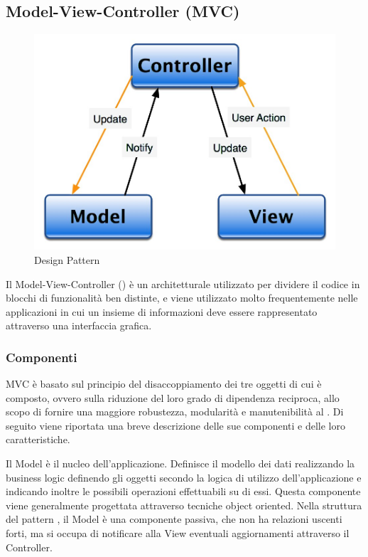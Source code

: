 \documentclass[a4paper, titlepage]{article}
\begin{document}
\subsection{Model-View-Controller (MVC)}
\begin{figure}[htp]
\centering
\includegraphics[scale=0.50]{Img/MVC.jpg}
\caption{Design Pattern }
\label{} 
\end{figure}
Il Model-View-Controller () è un  architetturale utilizzato per dividere il codice in blocchi di funzionalità ben distinte, e viene utilizzato molto frequentemente nelle applicazioni in cui un insieme di informazioni deve essere rappresentato attraverso una interfaccia grafica.

\subsubsection{Componenti}
MVC è basato sul principio del disaccoppiamento dei tre oggetti di cui è composto, ovvero sulla riduzione del loro grado di dipendenza reciproca, allo scopo di fornire una maggiore robustezza, modularità e manutenibilità al .
\newline Di seguito viene riportata una breve descrizione delle sue componenti e delle loro caratteristiche.

Il Model è il nucleo dell’applicazione. Definisce il modello dei dati realizzando la business logic definendo gli oggetti secondo la logica di utilizzo dell’applicazione e indicando inoltre le possibili operazioni effettuabili su di essi.
\newline Questa componente viene generalmente progettata attraverso tecniche object oriented.
\newline Nella struttura del pattern , il Model è una componente passiva, che non ha relazioni uscenti forti, ma si occupa di notificare alla View eventuali aggiornamenti attraverso il Controller.
\end{document}
